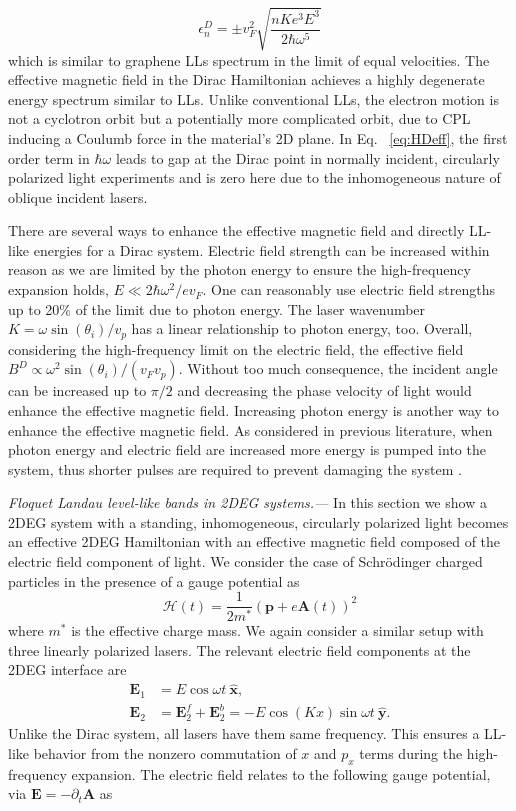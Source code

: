 \documentclass[aps,prb,twocolumn,showpacs,superscriptaddress]{revtex4-2}
\let\oldhat\hat
\renewcommand{\hat}[1]{\oldhat{\mathbf{#1}}}
\renewcommand{\vec}[1]{\mathbf{#1}}
\newcommand{\ham}{\mathcal{H}}
\begin{document}
\begin{equation} \label{eq:DiracEner}
  \epsilon_{n}^D = \pm v_F^2 \sqrt{\dfrac{nK e^3 E^3}{2 \hbar \omega^5}}
\end{equation}
which is similar to graphene LLs spectrum in the limit of equal velocities.
The effective magnetic field in the Dirac Hamiltonian achieves a highly degenerate energy spectrum similar to LLs.
Unlike conventional LLs, the electron motion is not a cyclotron orbit but a potentially more complicated orbit, due to CPL inducing a Coulumb force in the material's 2D plane.
In Eq. ~\eqref{eq:HDeff}, the first order term in $\hbar \omega$ leads to gap at the Dirac point in normally incident, circularly polarized light experiments \cite{YHW, JWM} and is zero here due to the inhomogeneous nature of oblique incident lasers.

There are several ways to enhance the effective magnetic field and directly LL-like energies for a Dirac system.
Electric field strength can be increased within reason as we are limited by the photon energy to ensure the high-frequency expansion holds, $E \ll 2\hbar\omega^2/e v_F$.
One can reasonably use electric field strengths up to 20\% of the limit due to photon energy.
The laser wavenumber $K= \omega \sin{(\theta_i)} / v_p$ has a linear relationship to photon energy, too.
Overall, considering the high-frequency limit on the electric field, the effective field $B^D \propto \omega^2 \sin{(\theta_i)} / (v_F v_p)$.
Without too much consequence, the incident angle can be increased up to $\pi/2$ and decreasing the phase velocity of light would enhance the effective magnetic field.
Increasing photon energy is another way to enhance the effective magnetic field.
As considered in previous literature, when photon energy and electric field are increased more energy is pumped into the system, thus shorter pulses are required to prevent damaging the system \cite{YHW, JWM}.

\emph{Floquet Landau level-like bands in 2DEG systems.---} In this section we show a 2DEG system with a standing, inhomogeneous, circularly polarized light becomes an effective 2DEG Hamiltonian with an effective magnetic field composed of the electric field component of light.
We consider the case of Schr\"{o}dinger charged particles in the presence of a gauge potential as
\begin{equation}\label{eq:H2deg}
  \ham(t) = \dfrac{1}{2m^*} \left( \vec{p} + e \vec{A}(t)\right)^2
\end{equation}
where $m^*$ is the effective charge mass.
We again consider a similar setup with three linearly polarized lasers.
The relevant electric field components at the 2DEG interface are
\begin{align} \label{eq:E2field}
  \vec{E}_{1} &= E \cos{\omega t}\ \hat{x}, \nonumber \\
  \vec{E}_{2} &= \vec{E}_2^f + \vec{E}_2^b = -E\cos{(K x)} \sin{\omega t}\ \hat{y}.
\end{align}%
Unlike the Dirac system, all lasers have them same frequency.
This ensures a LL-like behavior from the nonzero commutation of $x$ and $p_x$ terms during the high-frequency expansion.
The electric field relates to the following gauge potential, via $\vec{E} = -\partial_t \vec{A}$ as
\end{document}
